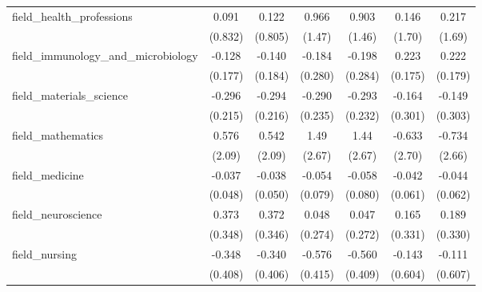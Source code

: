 \begin{tabular}{lcccccc}
   field\_health\_professions                                  & 0.091         & 0.122        & 0.966        & 0.903        & 0.146          & 0.217\\   
                                                               & (0.832)       & (0.805)      & (1.47)       & (1.46)       & (1.70)         & (1.69)\\   
   field\_immunology\_and\_microbiology                        & -0.128        & -0.140       & -0.184       & -0.198       & 0.223          & 0.222\\   
                                                               & (0.177)       & (0.184)      & (0.280)      & (0.284)      & (0.175)        & (0.179)\\   
   field\_materials\_science                                   & -0.296        & -0.294       & -0.290       & -0.293       & -0.164         & -0.149\\   
                                                               & (0.215)       & (0.216)      & (0.235)      & (0.232)      & (0.301)        & (0.303)\\   
   field\_mathematics                                          & 0.576         & 0.542        & 1.49         & 1.44         & -0.633         & -0.734\\   
                                                               & (2.09)        & (2.09)       & (2.67)       & (2.67)       & (2.70)         & (2.66)\\   
   field\_medicine                                             & -0.037        & -0.038       & -0.054       & -0.058       & -0.042         & -0.044\\   
                                                               & (0.048)       & (0.050)      & (0.079)      & (0.080)      & (0.061)        & (0.062)\\   
   field\_neuroscience                                         & 0.373         & 0.372        & 0.048        & 0.047        & 0.165          & 0.189\\   
                                                               & (0.348)       & (0.346)      & (0.274)      & (0.272)      & (0.331)        & (0.330)\\   
   field\_nursing                                              & -0.348        & -0.340       & -0.576       & -0.560       & -0.143         & -0.111\\   
                                                               & (0.408)       & (0.406)      & (0.415)      & (0.409)      & (0.604)        & (0.607)\\   

\end{tabular}
